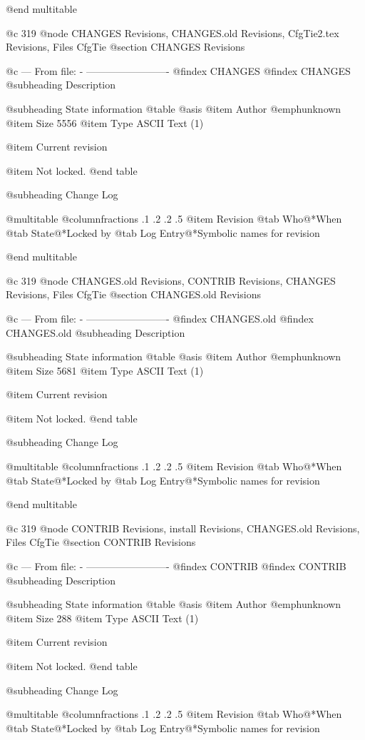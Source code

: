 @end multitable


@c 319
@node CHANGES Revisions, CHANGES.old Revisions, CfgTie2.tex Revisions, Files CfgTie
@section CHANGES Revisions


@c --- From file: - -------------------------
@findex CHANGES
@findex CHANGES
@subheading Description


@subheading State information
@table @asis
@item Author
@emph{unknown}
@item Size
5556
@item Type
ASCII Text (1)

@item Current revision

@item Not locked.
@end table

@subheading Change Log

@multitable @columnfractions .1 .2 .2 .5
@item Revision
@tab Who@*When
@tab State@*Locked by
@tab Log Entry@*Symbolic names for revision


@end multitable


@c 319
@node CHANGES.old Revisions, CONTRIB Revisions, CHANGES Revisions, Files CfgTie
@section CHANGES.old Revisions


@c --- From file: - -------------------------
@findex CHANGES.old
@findex CHANGES.old
@subheading Description


@subheading State information
@table @asis
@item Author
@emph{unknown}
@item Size
5681
@item Type
ASCII Text (1)

@item Current revision

@item Not locked.
@end table

@subheading Change Log

@multitable @columnfractions .1 .2 .2 .5
@item Revision
@tab Who@*When
@tab State@*Locked by
@tab Log Entry@*Symbolic names for revision


@end multitable


@c 319
@node CONTRIB Revisions, install Revisions, CHANGES.old Revisions, Files CfgTie
@section CONTRIB Revisions


@c --- From file: - -------------------------
@findex CONTRIB
@findex CONTRIB
@subheading Description


@subheading State information
@table @asis
@item Author
@emph{unknown}
@item Size
288
@item Type
ASCII Text (1)

@item Current revision

@item Not locked.
@end table

@subheading Change Log

@multitable @columnfractions .1 .2 .2 .5
@item Revision
@tab Who@*When
@tab State@*Locked by
@tab Log Entry@*Symbolic names for revision


